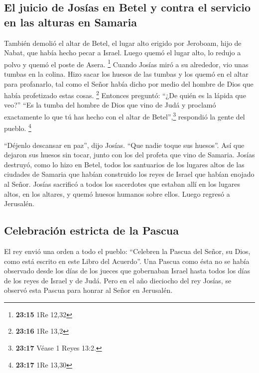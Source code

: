 \hypertarget{el-juicio-de-josuxedas-en-betel-y-contra-el-servicio-en-las-alturas-en-samaria}{%
\subsection{El juicio de Josías en Betel y contra el servicio en las
alturas en
Samaria}\label{el-juicio-de-josuxedas-en-betel-y-contra-el-servicio-en-las-alturas-en-samaria}}

 También demolió el altar de Betel, el lugar alto erigido
por Jeroboam, hijo de Nabat, que había hecho pecar a Israel. Luego quemó
el lugar alto, lo redujo a polvo y quemó el poste de Asera. \footnote{\textbf{23:15}
  1Re 12,32}  Cuando Josías miró a su alrededor, vio unas
tumbas en la colina. Hizo sacar los huesos de las tumbas y los quemó en
el altar para profanarlo, tal como el Señor había dicho por medio del
hombre de Dios que había profetizado estas cosas. \footnote{\textbf{23:16}
  1Re 13,2}  Entonces preguntó: ``¿De quién es la lápida
que veo?'' ``Es la tumba del hombre de Dios que vino de Judá y proclamó
exactamente lo que tú has hecho con el altar de Betel'',\footnote{\textbf{23:17}
  Véase 1 Reyes 13:2.} respondió la gente del pueblo. \footnote{\textbf{23:17}
  1Re 13,30}

 ``Déjenlo descansar en paz'', dijo Josías. ``Que nadie
toque sus huesos''. Así que dejaron sus huesos sin tocar, junto con los
del profeta que vino de Samaria.  Josías destruyó, como
lo hizo en Betel, todos los santuarios de los lugares altos de las
ciudades de Samaria que habían construido los reyes de Israel que habían
enojado al Señor.  Josías sacrificó a todos los
sacerdotes que estaban allí en los lugares altos, en los altares, y
quemó huesos humanos sobre ellos. Luego regresó a Jerusalén.

\hypertarget{celebraciuxf3n-estricta-de-la-pascua}{%
\subsection{Celebración estricta de la
Pascua}\label{celebraciuxf3n-estricta-de-la-pascua}}

 El rey envió una orden a todo el pueblo: ``Celebren la
Pascua del Señor, su Dios, como está escrito en este Libro del
Acuerdo''.  Una Pascua como ésta no se había observado
desde los días de los jueces que gobernaban Israel hasta todos los días
de los reyes de Israel y de Judá.  Pero en el año
dieciocho del rey Josías, se observó esta Pascua para honrar al Señor en
Jerusalén.


